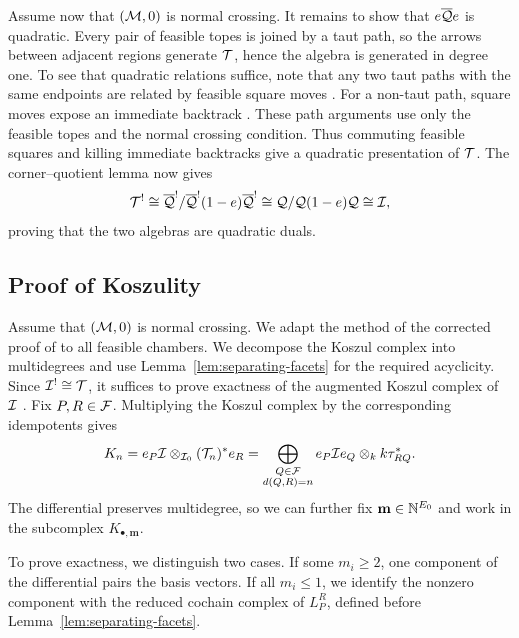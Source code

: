 Assume now that $(\mathcal M,0)$ is normal crossing. It remains to show that
$e\overline{\mathcal Q} e$ is quadratic.
Every pair of feasible topes is joined by a taut path, so the
arrows between adjacent regions generate $\mathcal T$, hence the algebra is generated in degree one. To see that quadratic relations suffice, note that any two taut paths with the same endpoints are related by
feasible square moves \cite[Proposition 3.5]{KowalenkoMautner}.
For a non-taut path, square moves expose an immediate backtrack
\cite[proof of Proposition 3.6]{KowalenkoMautner}. These path arguments
use only the feasible topes and the normal crossing condition. Thus commuting
feasible squares and killing immediate backtracks give a quadratic
presentation of $\mathcal T$.
The corner--quotient lemma \cite[Lemma 8.22]{BradenLicataProudfootWebster2012}
now gives
\[
 \mathcal T^!
 \cong\overline{\mathcal Q}^!/\overline{\mathcal Q}^!(1-e)\overline{\mathcal Q}^!
 \cong\mathcal Q/\mathcal Q(1-e)\mathcal Q
 \cong\mathcal I,
\]
proving that the two algebras are quadratic duals.
\subsection{Proof of Koszulity}
Assume that $(\mathcal M,0)$ is normal crossing. We adapt the method of the corrected proof
of \cite[Lemma 8.25]{BradenLicataProudfootWebster2012} to all feasible
chambers. We decompose the Koszul complex into multidegrees and use
Lemma~\ref{lem:separating-facets} for the required acyclicity.
Since $\mathcal I^!\cong\mathcal T$, it suffices to prove
exactness of the augmented Koszul complex of $\mathcal I$
\cite[Theorem 2.6.1, \S2.8]{BeilinsonGinzburgSoergel1996}.
Fix $P,R\in\mathcal F$. Multiplying the Koszul complex by the corresponding
idempotents gives
\[
 K_n=e_P\mathcal I\otimes_{\mathcal I_0}(\mathcal T_n)^*e_R
 =\bigoplus_{\substack{Q\in\mathcal F\\d(Q,R)=n}}
     e_P\mathcal I e_Q\otimes_k k\tau_{RQ}^*.
\]
The differential preserves multidegree, so we can further fix
$\mathbf m\in\mathbb N^{E_0}$ and work in the subcomplex
$K_{\bullet,\mathbf m}$.

To prove exactness, we distinguish two cases. If some $m_i\geq2$,
one component of the differential pairs the basis vectors.
If all $m_i\leq1$, we identify the nonzero component with the
reduced cochain complex of $L_P^R$, defined before
Lemma~\ref{lem:separating-facets}.

